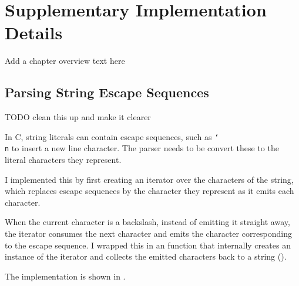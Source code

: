 \documentclass[../00-main.tex]{subfiles}
\begin{document}
\chapter{Supplementary Implementation Details}

\begin{mrwComment}
Add a chapter overview text here
\end{mrwComment}

\section{Parsing String Escape Sequences}

\begin{mrwComment}
TODO clean this up and make it clearer
\end{mrwComment}

In C, string literals can contain escape sequences, such as \texttt{\char`\\n} to insert a new line character.
The parser needs to be convert these to the literal characters they represent.

I implemented this by first creating an iterator over the characters of the string, which replaces escape sequences by the character they represent as it emits each character.

When the current character is a backslash, instead of emitting it straight away, the iterator consumes the next character and emits the character corresponding to the escape sequence.
I wrapped this in an  function that internally creates an instance of the iterator and collects the emitted characters back to a string ().

The implementation is shown in .
\end{document}
